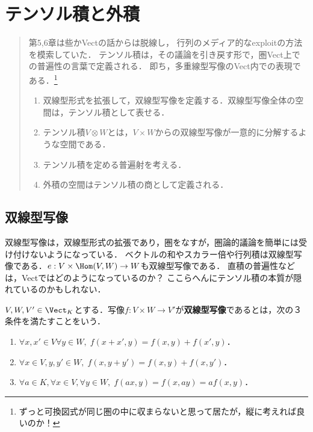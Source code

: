 \documentclass[uplatex, dvipdfmx]{jsreport}
\begin{document}
\chapter{テンソル積と外積}

\begin{quotation}
    第5,6章は些かVectの話からは脱線し，
    行列のメディア的なexploitの方法を模索していた．
    テンソル積は，その議論を引き戻す形で，圏Vect上での普遍性の言葉で定義される．
    即ち，多重線型写像のVect内での表現である．\footnote{ずっと可換図式が同じ圏の中に収まらないと思って居たが，縦に考えれば良いのか！}
    \begin{enumerate}
        \item 双線型形式を拡張して，双線型写像を定義する．双線型写像全体の空間は，テンソル積として表せる．
        \item テンソル積$V\otimes W$とは，$V\times W$からの双線型写像が一意的に分解するような空間である．
        \item テンソル積を定める普遍射を考える．
        \item 外積の空間はテンソル積の商として定義される．
    \end{enumerate}
\end{quotation}

\section{双線型写像}

\begin{tcolorbox}[colframe=ForestGreen, colback=ForestGreen!10!white, breakable]
    双線型写像は，双線型形式の拡張であり，圏をなすが，圏論的議論を簡単には受け付けないようになっている．
    ベクトルの和やスカラー倍や行列積は双線型写像である．$e:V\times\Hom(V,W)\to W$も双線型写像である．
    直積の普遍性などは，Vectではどのようになっているのか？
    ここらへんにテンソル積の本質が隠れているのかもしれない．
\end{tcolorbox}

\begin{definition}
    $V,W,V'\in\Vect_K$とする．写像$f:V\times W\to V'$が\textbf{双線型写像}であるとは，次の３条件を満たすことをいう．
    \begin{enumerate}
        \item $\forall x,x'\in V\forall y\in W,\;f(x+x',y)=f(x,y)+f(x',y)$．
        \item $\forall x\in V,y,y'\in W,\;f(x,y+y')=f(x,y)+f(x,y')$．
        \item $\forall a\in K,\forall x\in V,\forall y\in W,\;f(ax,y)=f(x,ay)=af(x,y)$．
    \end{enumerate}
\end{definition}
\end{document}

